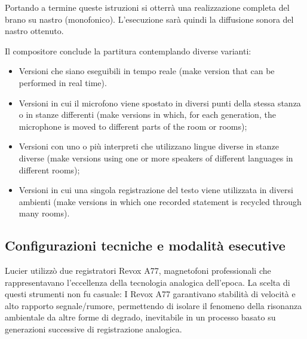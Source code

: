 Portando a termine queste istruzioni si otterrà una realizzazione completa del brano su nastro (monofonico). L'esecuzione sarà quindi la diffusione sonora del nastro ottenuto.

Il compositore conclude la partitura contemplando diverse varianti:

\begin{itemize}
    \item Versioni che siano eseguibili in tempo reale (make version that can be performed in real time).
\end{itemize}

\begin{itemize}
    \item Versioni in cui il microfono viene spostato in diversi punti della stessa stanza o in stanze differenti (make versions in which, for each generation, the microphone is moved to different parts of the room or rooms);
\end{itemize}

\begin{itemize}
    \item Versioni con uno o più interpreti che utilizzano lingue diverse in stanze diverse (make versions using one or more speakers of different languages in different rooms);
\end{itemize}

\begin{itemize}
    \item Versioni in cui una singola registrazione del testo viene utilizzata in diversi ambienti (make versions in which one recorded statement is recycled through many rooms).
\end{itemize}

\subsection{Configurazioni tecniche e modalità esecutive}

Lucier utilizzò due registratori Revox A77, magnetofoni professionali che rappresentavano l'eccellenza della tecnologia analogica dell'epoca. La scelta di questi strumenti non fu casuale: I Revox A77 garantivano stabilità di velocità e alto rapporto segnale/rumore, permettendo di isolare il fenomeno della risonanza ambientale da altre forme di degrado, inevitabile in un processo basato su generazioni successive di registrazione analogica.

